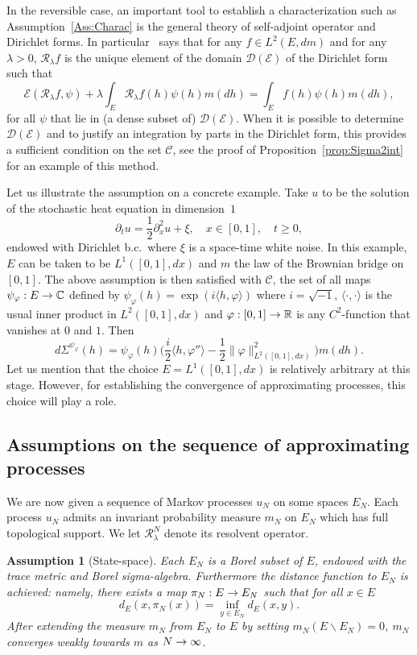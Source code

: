 \documentclass[AHL,Unicode,longabstracts]{cedram}
\theoremstyle{plain}
\newtheorem{assu}[cdrthm]{Assumption}}
\newcommand{\cC}{\mathcal{C}}
\newcommand{\cD}{\mathcal{D}}
\newcommand{\cE}{\mathcal{E}}
\newcommand{\cR}{\mathcal{R}}
\newcommand{\R}{\mathbb{R}}
\newcommand{\C}{\mathbb{C}}
\renewcommand*{\to}{\mathchoice{\longrightarrow}{\rightarrow}{\rightarrow}{\rightarrow}}
\begin{document}
In the reversible case, an important tool to establish a characterization such as Assumption~\ref{Ass:Charac} is the general theory of self-adjoint operator and Dirichlet forms. In particular~\cite[Theorem~I.2.8]{MaRockner} says that for any $f\in L^2(E,dm)$ and for any $\lambda > 0$, $\cR_\lambda f$ is the unique element of the domain $\cD(\cE)$ of the Dirichlet form such that
\[\label{Eq:CharactDirichlet}
\cE(\cR_\lambda f, \psi) + \lambda \int_E \cR_\lambda f(h) \psi(h) m(dh) = \int_E f(h)\psi(h) m(dh),
\]
for all $\psi$ that lie in (a dense subset of) $\cD(\cE)$. When it is possible to determine $\cD(\cE)$ and to justify an integration by parts in the Dirichlet form, this provides a sufficient condition on the set $\cC$, see the proof of Proposition~\ref{prop:Sigma2int} for an example of this method.



Let us illustrate the assumption on a concrete example. Take $u$ to be the solution of the stochastic heat equation in dimension~$1$
\[
\partial_t u = \frac12 \partial^2_x u + \xi,\quad x\in [0,1],\quad t\ge 0,
\]
endowed with Dirichlet b.c.~where $\xi$ is a space-time white noise. In this example, $E$ can be taken to be $L^1([0,1],dx)$ and $m$ the law of the Brownian bridge on $[0,1]$. The above assumption is then satisfied with $\cC$, the set of all maps $\psi_{\varphi}:E\to\C$ defined by $\psi_\varphi(h) = \exp(i \langle h,\varphi\rangle)$ where $i = \sqrt{-1}$, $\langle \cdot,\cdot\rangle$ is the usual inner product in $L^2([0,1],dx)$ and $\varphi:[0,1]\to\R$ is any $C^2$-function that vanishes at $0$ and $1$. Then
\[
d\Sigma^{\psi_\varphi}(h) = \psi_\varphi(h)\Big(\frac{i}{2} \langle h,\varphi''\rangle - \frac12 \|\varphi\|_{L^2([0,1],dx)}^2 \Big) m(dh).
\]
Let us mention that the choice $E=L^1([0,1],dx)$ is relatively arbitrary at this stage. However, for establishing the convergence of approximating processes, this choice will play a role.


\subsection*{Assumptions on the sequence of approximating processes}

We are now given a sequence of Markov processes $u_N$ on some spaces $E_N$. Each process $u_N$ admits an invariant probability measure $m_N$ on $E_N$ which has full topological support. We let $\cR^N_\lambda$ denote its resolvent operator.

\begin{assu}[State-space]\label{Ass:State}
Each $E_N$ is a Borel subset of $E$, endowed with the trace metric and Borel sigma-algebra. Furthermore the distance function to $E_N$ is achieved: namely, there exists a map $\pi_N:E\to E_N$ such that for all $x\in E$
\[
d_E(x, \pi_N(x)) = \inf_{y\in E_N} d_E(x, y).
\]
After extending the measure $m_N$ from $E_N$ to $E$ by setting $m_N(E\backslash E_N)=0$, $m_N$ converges weakly towards $m$ as $N\to\infty$.
\end{assu}
\end{document}
